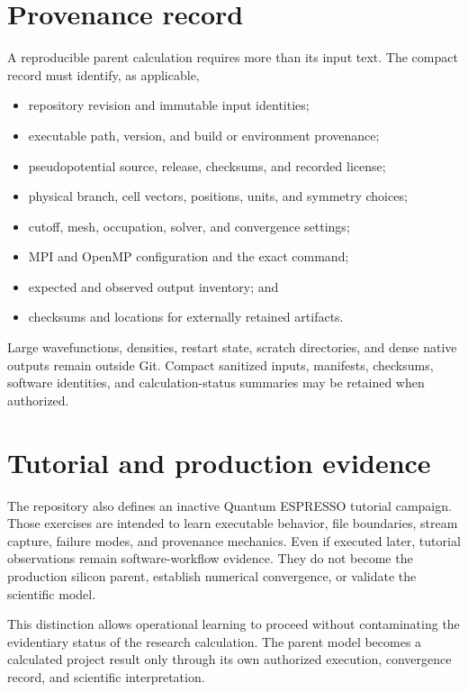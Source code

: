 \section{Provenance record}


A reproducible parent calculation requires more than its input text. The compact
record must identify, as applicable,

\begin{itemize}
  \item repository revision and immutable input identities;
  \item executable path, version, and build or environment provenance;
  \item pseudopotential source, release, checksums, and recorded license;
  \item physical branch, cell vectors, positions, units, and symmetry choices;
  \item cutoff, mesh, occupation, solver, and convergence settings;
  \item MPI and OpenMP configuration and the exact command;
  \item expected and observed output inventory; and
  \item checksums and locations for externally retained artifacts.
\end{itemize}

Large wavefunctions, densities, restart state, scratch directories, and dense
native outputs remain outside Git. Compact sanitized inputs, manifests,
checksums, software identities, and calculation-status summaries may be retained
when authorized.

\section{Tutorial and production evidence}


The repository also defines an inactive Quantum ESPRESSO tutorial campaign.
Those exercises are intended to learn executable behavior, file boundaries,
stream capture, failure modes, and provenance mechanics. Even if executed later,
tutorial observations remain software-workflow evidence. They do not become the
production silicon parent, establish numerical convergence, or validate the
scientific model.

This distinction allows operational learning to proceed without contaminating
the evidentiary status of the research calculation. The parent model becomes a
calculated project result only through its own authorized execution,
convergence record, and scientific interpretation.
